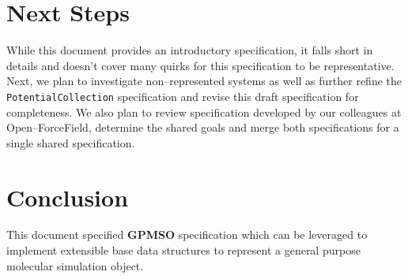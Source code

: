 \documentclass[12pt]{article}
\begin{document}
\section{Next Steps}
While this document provides an introductory specification, it falls short in details and doesn't cover many quirks for this specification to be representative. Next, we plan to investigate non--represented systems as well as further refine the \texttt{PotentialCollection} specification and revise this draft specification for completeness. We also plan to review specification developed by our colleagues at Open--ForceField, determine the shared goals and merge both specifications for a single shared specification.

\section{Conclusion}
This document specified \textbf{GPMSO} specification which can be leveraged to implement extensible base data structures to represent a general purpose molecular simulation object.
\end{document}
